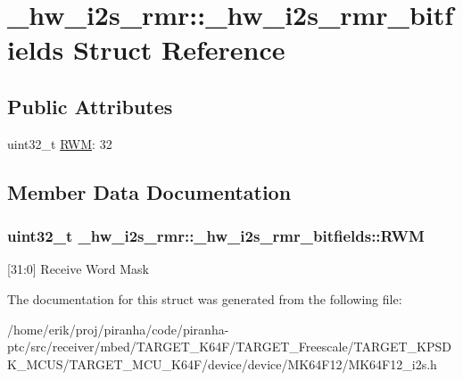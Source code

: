 \hypertarget{struct__hw__i2s__rmr_1_1__hw__i2s__rmr__bitfields}{}\section{\+\_\+hw\+\_\+i2s\+\_\+rmr\+:\+:\+\_\+hw\+\_\+i2s\+\_\+rmr\+\_\+bitfields Struct Reference}
\label{struct__hw__i2s__rmr_1_1__hw__i2s__rmr__bitfields}
\subsection*{Public Attributes}
\begin{DoxyCompactItemize}
\item 
uint32\+\_\+t \hyperlink{struct__hw__i2s__rmr_1_1__hw__i2s__rmr__bitfields_a3d91fa63dd4737b6b467d1ab0130a8cb}{R\+WM}\+: 32
\end{DoxyCompactItemize}


\subsection{Member Data Documentation}
\subsubsection[{\texorpdfstring{R\+WM}{RWM}}]{\setlength{\rightskip}{0pt plus 5cm}uint32\+\_\+t \+\_\+hw\+\_\+i2s\+\_\+rmr\+::\+\_\+hw\+\_\+i2s\+\_\+rmr\+\_\+bitfields\+::\+R\+WM}\hypertarget{struct__hw__i2s__rmr_1_1__hw__i2s__rmr__bitfields_a3d91fa63dd4737b6b467d1ab0130a8cb}{}\label{struct__hw__i2s__rmr_1_1__hw__i2s__rmr__bitfields_a3d91fa63dd4737b6b467d1ab0130a8cb}
\mbox{[}31\+:0\mbox{]} Receive Word Mask 

The documentation for this struct was generated from the following file\+:\begin{DoxyCompactItemize}
\item 
/home/erik/proj/piranha/code/piranha-\/ptc/src/receiver/mbed/\+T\+A\+R\+G\+E\+T\+\_\+\+K64\+F/\+T\+A\+R\+G\+E\+T\+\_\+\+Freescale/\+T\+A\+R\+G\+E\+T\+\_\+\+K\+P\+S\+D\+K\+\_\+\+M\+C\+U\+S/\+T\+A\+R\+G\+E\+T\+\_\+\+M\+C\+U\+\_\+\+K64\+F/device/device/\+M\+K64\+F12/M\+K64\+F12\+\_\+i2s.\+h\end{DoxyCompactItemize}
